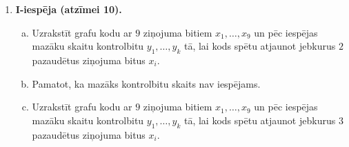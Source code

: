 \documentclass[a4paper]{article}
\begin{document}
\begin{enumerate}
\item {\bf I-iespēja (atzīmei 10).} 
\begin{enumerate}[(a)]
\item Uzrakstīt grafu kodu ar $9$ ziņojuma bitiem $x_1,\ldots,x_{9}$ 
un pēc iespējas mazāku skaitu kontrolbitu $y_1,\ldots,y_k$ tā, 
lai kods spētu atjaunot jebkurus $2$ pazaudētus ziņojuma bitus $x_i$.
\item Pamatot, ka mazāks kontrolbitu skaits nav iespējams.
\item Uzrakstīt grafu kodu ar $9$ ziņojuma bitiem $x_1,\ldots,x_{9}$ 
un pēc iespējas mazāku skaitu kontrolbitu $y_1,\ldots,y_k$ tā, 
lai kods spētu atjaunot jebkurus $3$ pazaudētus ziņojuma bitus $x_i$.
\end{enumerate}
\end{enumerate}
\end{document}
